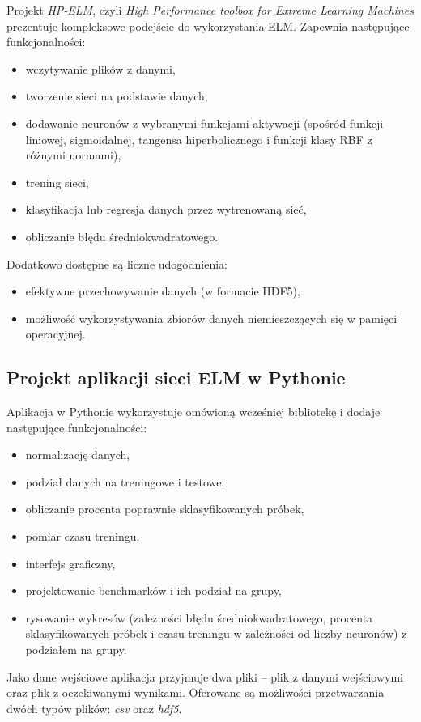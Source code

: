 \documentclass{article}
\begin{document}
Projekt \textit{HP-ELM}, czyli \textit{High Performance toolbox for Extreme Learning Machines} prezentuje kompleksowe podejście do wykorzystania ELM. Zapewnia następujące funkcjonalności:
\begin{itemize}
\item wczytywanie plików z danymi,
\item tworzenie sieci na podstawie danych,
\item dodawanie neuronów z wybranymi funkcjami aktywacji (spośród funkcji liniowej, sigmoidalnej, tangensa hiperbolicznego i funkcji klasy RBF z różnymi normami),
\item trening sieci,
\item klasyfikacja lub regresja danych przez wytrenowaną sieć,
\item obliczanie błędu średniokwadratowego.
\end{itemize}
Dodatkowo dostępne są liczne udogodnienia:
\begin{itemize}
\item efektywne przechowywanie danych (w formacie HDF5),
\item możliwość wykorzystywania zbiorów danych niemieszczących się w pamięci operacyjnej.
\end{itemize}
\subsection{Projekt aplikacji sieci ELM w Pythonie}
Aplikacja w Pythonie wykorzystuje omówioną wcześniej bibliotekę i dodaje następujące funkcjonalności:
\begin{itemize}
\item normalizację danych,
\item podział danych na treningowe i testowe,
\item obliczanie procenta poprawnie sklasyfikowanych próbek,
\item pomiar czasu treningu,
\item interfejs graficzny,
\item projektowanie benchmarków i ich podział na grupy,
\item rysowanie wykresów (zależności błędu średniokwadratowego, procenta sklasyfikowanych próbek i czasu treningu w zależności od liczby neuronów) z podziałem na grupy.
\end{itemize}
Jako dane wejściowe aplikacja przyjmuje dwa pliki -- plik z danymi wejściowymi oraz plik z oczekiwanymi wynikami. Oferowane są możliwości przetwarzania dwóch typów plików: \textit{csv} oraz \textit{hdf5}. 
\end{document}
